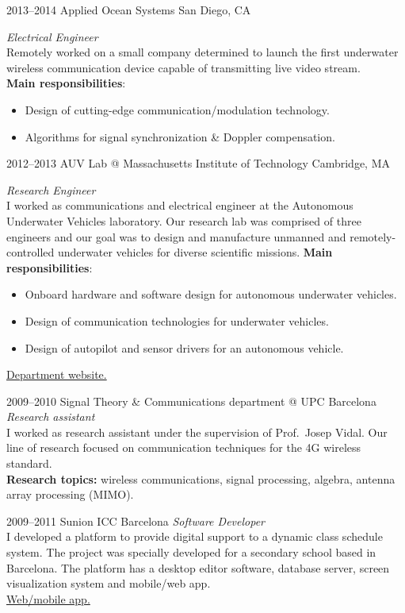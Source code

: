\documentclass[]{friggeri-cv} %
\begin{document}
\begin{entrylist}

\entry
{2013--2014}
{Applied Ocean Systems}
{San Diego, CA}
{%
\emph{Electrical Engineer} \\
Remotely worked on a small company determined to launch the first
underwater wireless communication device capable of transmitting live
video stream. \\
{\bf Main responsibilities}:
  \begin{itemize}
    \item Design of cutting-edge communication/modulation technology.
    \item Algorithms for signal synchronization \& Doppler compensation.
  \end{itemize}
}


\entry
{2012--2013}
{AUV Lab @ Massachusetts Institute of Technology}
{Cambridge, MA}
{%
\emph{Research Engineer} \\
I worked as communications and electrical engineer at the Autonomous
Underwater Vehicles laboratory. Our research lab was comprised of
three engineers and our goal was to design and manufacture unmanned
and remotely-controlled underwater vehicles for diverse scientific
missions.
{\bf Main responsibilities}:
  \begin{itemize}
    \item Onboard hardware and software design for autonomous
      underwater vehicles.
    \item Design of communication technologies for underwater
      vehicles.
    \item Design of autopilot and sensor drivers for an autonomous vehicle.
  \end{itemize}
\href{http://seagrant.mit.edu}{{\FA\faExternalLink} Department website.}
}


\entry
{2009--2010}
{Signal Theory \& Communications department @ UPC}
{Barcelona}
{%
\emph{Research assistant} \\
I worked as research assistant under the supervision of Prof.\ Josep
Vidal. Our line of research focused on communication techniques for the 4G
wireless standard. \\
{\bf Research topics:} wireless communications, signal processing,
algebra, antenna array processing (MIMO).
}



\entry
{2009--2011}
{Sunion ICC}
{Barcelona}
{%
\emph{Software Developer} \\
I developed a platform to provide digital support to a dynamic class
schedule system. The project was specially developed for a
secondary school based in Barcelona. The platform has a desktop editor
software, database server, screen visualization system and mobile/web
app. \\
\href{http://horari.sunion.net}{{\FA\faExternalLink} Web/mobile app.}
}


\end{entrylist}
\end{document}
